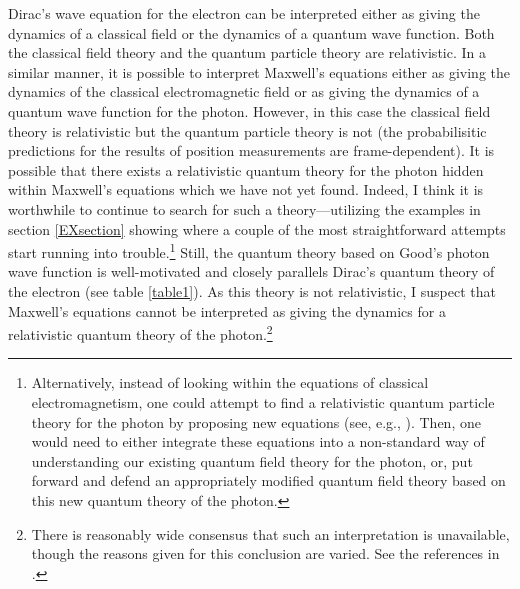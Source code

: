 \documentclass[12pt,secnumarabic,amsmath,amssymb,balancelastpage,nofootinbib]{article}
\begin{document}
Dirac's wave equation for the electron can be interpreted either as giving the dynamics of a classical field or the dynamics of a quantum wave function.  Both the classical field theory and the quantum particle theory are relativistic.  In a similar manner, it is possible to interpret Maxwell's equations either as giving the dynamics of the classical electromagnetic field or as giving the dynamics of a quantum wave function for the photon.  However, in this case the classical field theory is relativistic but the quantum particle theory is not (the probabilisitic predictions for the results of position measurements are frame-dependent).  It is possible that there exists a relativistic quantum theory for the photon hidden within Maxwell's equations which we have not yet found.  Indeed, I think it is worthwhile to continue to search for such a theory---utilizing the examples in section \ref{EXsection} showing where a couple of the most straightforward attempts start running into trouble.\footnote{Alternatively, instead of looking within the equations of classical electromagnetism, one could attempt to find a relativistic quantum particle theory for the photon by proposing new equations (see, e.g., \citealp{kiessling2017}).  Then, one would need to either integrate these equations into a non-standard way of understanding our existing quantum field theory for the photon, or, put forward and defend an appropriately modified quantum field theory based on this new quantum theory of the photon.}  Still, the quantum theory based on Good's photon wave function is well-motivated and closely parallels Dirac's quantum theory of the electron (see table \ref{table1}).  As this theory is not relativistic, I suspect that Maxwell's equations cannot be interpreted as giving the dynamics for a relativistic quantum theory of the photon.\footnote{There is reasonably wide consensus that such an interpretation is unavailable, though the reasons given for this conclusion are varied.  See the references in \citet{kiessling2017}.}
\end{document}
